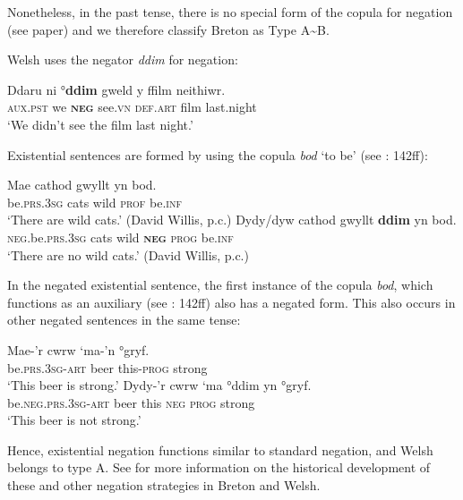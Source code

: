 \documentclass[output=paper,colorlinks,citecolor=brown]{langscibook}
\begin{document}
\begin{paperappendix}
\begin{unindented}
Nonetheless, in the past tense, there is no special form of the copula for negation (see paper) and we therefore classify Breton as Type A{\textasciitilde}B.


Welsh uses the negator \textit{ddim} for negation:
%
\begin{exe}\ex \gll Ddaru ni °\textbf{ddim} gweld y ffilm neithiwr. \\
\textsc{aux.pst} we \textbf{\textsc{neg}} see.\textsc{vn} \textsc{def.art} film   last.night \\
    \glt `We didn't see the film last night.' \citep[190]{King2003}
    \end{exe}

Existential sentences are formed by using the copula \textit{bod} `to be' (see \citealt{King2003}: 142ff):
%
\begin{exe}\ex \gll Mae cathod  gwyllt  yn  bod.  \\
be.\textsc{prs.3sg}  cats  wild  \textsc{prof}  be.\textsc{inf} \\
    \glt `There are wild cats.' (David Willis, p.c.)
\ex \gll Dydy/dyw cathod  gwyllt  \textbf{ddim}  yn   bod.  \\
\textsc{neg}.be.\textsc{prs.3sg}  cats  wild  \textbf{\textsc{neg}}  \textsc{prog}  be.\textsc{inf} \\
    \glt `There are no wild cats.' (David Willis, p.c.)
    \end{exe}

In the negated existential sentence, the first instance of the copula \textit{bod}, which functions as an auxiliary (see \citealt{King2003}: 142ff) also has a negated form. This also occurs in other negated sentences in the same tense:
%
\begin{exe}\ex \gll Mae-’r cwrw `ma-'n     °gryf. \\
be.\textsc{prs.3sg-art} beer    this-\textsc{prog} strong \\
    \glt `This beer is strong.' \citep[146]{King2003}
\ex \gll Dydy-’r cwrw ‘ma °ddim yn   °gryf. \\
be.\textsc{neg.prs.3sg-art} beer this \textsc{neg} \textsc{prog} strong \\
    \glt `This beer is not strong.' \citep[146]{King2003}
    \end{exe}

Hence, existential negation functions similar to standard negation, and Welsh belongs to type A. See \citet{Willis2013} for more information on the historical development of these and other negation strategies in Breton and Welsh. 


\end{unindented}
\end{paperappendix}
\end{document}
